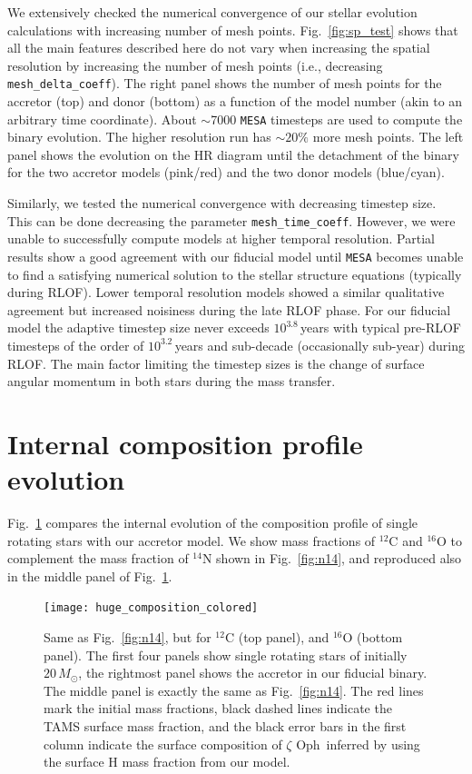 \documentclass[twocolumn,twocolappendix,trackchanges]{aastex63}
\DeclareRobustCommand{\Figref}[1]{Fig.~\ref{#1}}
\newcommand{\zoph}{$\zeta$ Oph}
\begin{document}
We extensively checked the numerical convergence of our stellar
evolution calculations with increasing number of mesh
points. \Figref{fig:sp_test} shows that all the main features described
here do not vary when increasing the spatial resolution by increasing
the number of mesh points (i.e.,
decreasing \texttt{mesh\_delta\_coeff}). The right panel shows the
number of mesh points for the accretor (top) and donor (bottom) as a
function of the model number (akin to an arbitrary time
coordinate). About $\sim$7000 \texttt{MESA} timesteps are used to compute
the binary evolution. The higher resolution run has $\sim 20\%$ more
mesh points. The left panel shows the evolution on the HR diagram until the
detachment of the binary for the two accretor models (pink/red) and
the two donor models (blue/cyan).

Similarly, we tested the numerical convergence with decreasing
timestep size. This can be done decreasing the parameter
\texttt{mesh\_time\_coeff}. However, we were unable to successfully
compute models at higher temporal resolution. Partial results show a
good agreement with our fiducial model until \texttt{MESA} becomes
unable to find a satisfying numerical solution to the stellar
structure equations (typically
during RLOF). Lower temporal resolution models showed a similar
qualitative agreement but increased noisiness during the late RLOF
phase. For our fiducial model the adaptive timestep size never exceeds
$10^{3.8}$\,years with typical pre-RLOF timesteps of the order of $10^{3.2}$\,years
and sub-decade (occasionally sub-year) during RLOF. The main factor limiting the timestep
sizes is the change of surface angular momentum in both stars during
the mass transfer.


\section{Internal composition profile evolution}
\label{sec:X_fig}


\Figref{fig:composition_huge} compares the internal evolution of the composition
profile of single rotating stars with our accretor model.
We show mass fractions of $^{12}\mathrm{C}$  and $^{16}\mathrm{O}$ to complement the
mass fraction of $^{14}\mathrm{N}$ shown in \Figref{fig:n14}, and
reproduced also in the middle panel of \Figref{fig:composition_huge}.


\begin{figure}[htbp]
  \centering
  \texttt{[image: huge\_composition\_colored]}
  \caption{Same as \Figref{fig:n14}, but for $^{12}\mathrm{C}$ (top
    panel), and $^{16}\mathrm{O}$ (bottom panel). The first four
    panels show single rotating stars of initially $20\,M_\odot$, the
    rightmost panel shows the accretor in our fiducial binary. The middle panel is
    exactly the same as \Figref{fig:n14}. The red lines mark the
    initial mass fractions, black dashed lines indicate the TAMS surface mass
    fraction, and the black error bars in the first column indicate
    the surface composition of \zoph\ inferred by 
    using the surface H mass fraction from our model.}
  \label{fig:composition_huge}
\end{figure}



\end{document}
